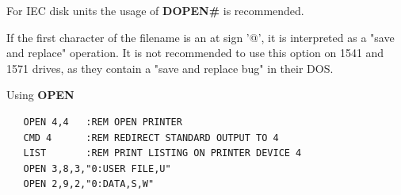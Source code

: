 \begin{description}[leftmargin=2cm,style=nextline]
\item [Remarks:]
   For IEC disk units the usage of {\bf DOPEN\#} is recommended.

   If the first character of the filename is an at sign '@', it
   is interpreted as a "save and replace" operation. It is not recommended
   to use this option on 1541 and 1571 drives, as they
   contain a "save and replace bug" in their DOS.

\item [Example:] Using {\bf OPEN}

\begin{tcolorbox}[colback=black,coltext=white]
\verbatimfont{\codefont}
\begin{verbatim}
   OPEN 4,4   :REM OPEN PRINTER
   CMD 4      :REM REDIRECT STANDARD OUTPUT TO 4
   LIST       :REM PRINT LISTING ON PRINTER DEVICE 4
   OPEN 3,8,3,"0:USER FILE,U"
   OPEN 2,9,2,"0:DATA,S,W"
\end{verbatim}
\end{tcolorbox}
\end{description}


\newpage
